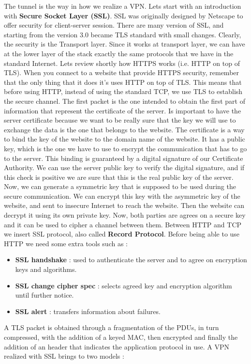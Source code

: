 \documentclass[11pt]{article}
\begin{document}
The tunnel is the way in how we realize a VPN. Lets start with an introduction with \textbf{Secure Socket Layer (SSL)}. SSL was originally designed by Netscape to offer security for client-server session. There are many version of SSL, and starting from the version 3.0 became TLS standard with small changes. Clearly, the security is the Transport layer. Since it works at transport layer, we can have at the lower layer of the stack exactly the same protocols that we have in the standard Internet. Lets review shortly how HTTPS works (i.e. HTTP on top of TLS). When you connect to a website that provide HTTPS security, remember that the only thing that it does it's uses HTTP on top of TLS. This means that before using HTTP, instead of using the standard TCP, we use TLS to establish the secure channel. The first packet is the one intended to obtain the first part of information that represent the certificate of the server. Is important to have the server certificate because we want to be really sure that the key we will use to exchange the data is the one that belongs to the website. The certificate is a way to bind the key of the website to the domain name of the website. It has a public key, which is the one we have to use to encrypt the communication that has to go to the server. This binding is guaranteed by a digital signature of our Certificate Authority. We can use the server public key to verify the digital signature, and if this check is positive we are sure that this is the real public key of the server. Now, we can generate a symmetric key that is supposed to be used during the secure communication. We can encrypt this key with the asymmetric key of the website, and sent to insecure Internet to reach the website. Then the website can decrypt it using its own private key. Now, both parties are agrees on a secure key and it can be used to cipher a channel between them. Between HTTP and TCP we insert SSL protocol, also called \textbf{Record Protocol}. Before being able to use HTTP we need some extra tools such as :
\begin{itemize}
\item \textbf{SSL handshake} : used to authenticate the server and to agree on encryption keys and algorithms.
\item \textbf{SSL change cipher spec} : selects agreed key and encryption algorithm until further notice.
\item \textbf{SSL alert} : transfers information about failures.
\end{itemize}
A TLS packet is obtained through a fragmentation of the PDUs, in turn compressed, with the addition of a keyed MAC, then encrypted and finally the addition of an header that indicates the application protocol in use. A VPN realized with SSL brings to two models :
\end{document}
